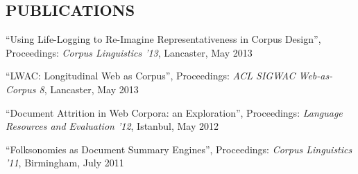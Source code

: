 \documentclass{res}
\begin{document}
\begin{resume}
 
\section{PUBLICATIONS} 
\vspace{0.1in}
``Using Life-Logging to Re-Imagine Representativeness in Corpus Design'',
Proceedings: {\it Corpus Linguistics '13},
Lancaster,
May 2013


``LWAC: Longitudinal Web as Corpus'',
Proceedings: {\it ACL SIGWAC Web-as-Corpus 8},
Lancaster,
May 2013

``Document Attrition in Web Corpora: an Exploration'',
Proceedings: {\it Language Resources and Evaluation '12}, 
Istanbul,
May 2012


``Folksonomies as Document Summary Engines'',
Proceedings: {\it Corpus Linguistics '11},
Birmingham,
July 2011

\end{resume}
\end{document}
